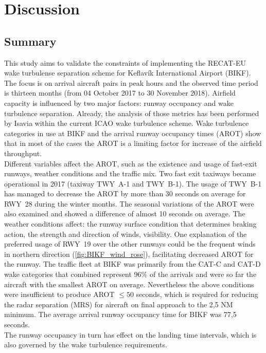


\chapter{Discussion}\label{cha:discussion}

\section{Summary}\label{sec:summary}
This study aims to validate the constraints of implementing the RECAT-EU wake turbulense separation scheme for Keflavík International Airport (BIKF). The focus is on arrival aircraft pairs in peak hours and the observed time period is thirteen months (from 04 October 2017 to 30 November 2018). 
Airfield capacity is influenced by two major factors: runway occupancy and wake turbulence separation. Already, the analysis of those metrics has been performed by Isavia within the current ICAO wake turbulence scheme. Wake turbulence categories in use at BIKF and the arrival runway occupancy times (AROT) show that in most of the cases the AROT is a limiting factor for increase of the airfield throughput.  \\
Different variables affect the AROT, such as the existence and usage of fast-exit runways, weather conditions and the traffic mix. Two fast exit taxiways became operational in 2017 (taxiway TWY~A-1 and TWY~B-1). The usage of TWY~B-1 has managed to decrease the AROT by more than 30 seconds on average for RWY~28 during the winter months. The seasonal variations of the AROT were also examined and showed a difference of almost 10 seconds on average. The weather conditions affect: the runway surface condition that determines braking action, the strength and direction of winds, visibility. One explanation of the preferred usage of RWY~19 over the other runways could be the frequent winds in northern direction (\ref{fig:BIKF_wind_rose}), facilitating decreased AROT for the runway. The traffic fleet at BIKF was primarily from the CAT-C and CAT-D wake categories that combined represent 96\% of the arrivals and were so far the aircraft with the smallest AROT on average. Nevertheless the above conditions were insufficient to produce AROT $\leq 50$ seconds, which is required for reducing the radar separation (MRS) for aircraft on final approach to the 2,5 NM minimum. The average arrival runway occupancy time for BIKF was 77,5 seconds. \\
The runway occupancy in turn has effect on the landing time intervals, which is also governed by the wake turbulence requirements.
